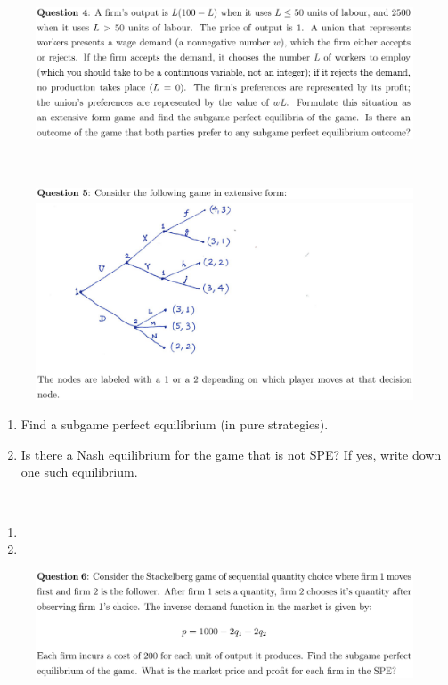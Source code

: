 \documentclass[12pt]{article}
\newenvironment{solution}[2][Solution]{\begin{trivlist}
\item[\hskip \labelsep {\bfseries #1}]}{\end{trivlist}}
\begin{document}
\begin{figure}[h!]
\includegraphics[width=\linewidth]{./assets/201806021727.png}
\end{figure}

\begin{solution}{}~\\

\end{solution}

\begin{figure}[h!]
\includegraphics[width=\linewidth]{./assets/201806021728.png}
\includegraphics[width=\linewidth]{./assets/201806021729.png}
\end{figure}
\begin{enumerate}[label=(\alph*)]
\item Find a subgame perfect equilibrium (in pure strategies).
\item Is there a Nash equilibrium for the game that is not SPE? If yes, write down one such equilibrium.
\end{enumerate}

\begin{solution}{}~\\
\begin{enumerate}[label=(\alph*)]
\item 
\item 
\end{enumerate}
\end{solution}

\begin{figure}[h!]
\includegraphics[width=\linewidth]{./assets/201806021730.png}
\end{figure}

\begin{solution}{}~\\

\end{solution}
\end{document}

